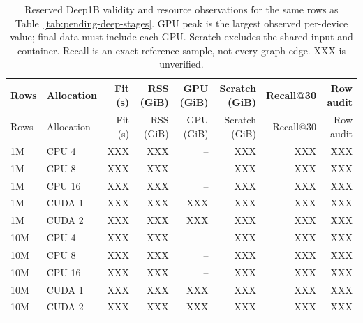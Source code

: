 \documentclass[article]{jss}
\begin{document}
{\scriptsize
\setlength{\tabcolsep}{2.5pt}
\begin{longtable}{llrrrrrr}
\caption{Reserved Deep1B validity and resource observations for the
  same rows as Table~\ref{tab:pending-deep-stages}. GPU peak is the
  largest observed per-device value; final data must include each GPU.
  Scratch excludes the shared input and container. Recall is an
  exact-reference sample, not every graph edge. XXX is unverified.}
\label{tab:pending-deep-validity}\\
\toprule
Rows & Allocation & Fit (s) & RSS (GiB) & GPU (GiB) &
  Scratch (GiB) & Recall@30 & Row audit \\
\midrule
\endfirsthead
\toprule
Rows & Allocation & Fit (s) & RSS (GiB) & GPU (GiB) &
  Scratch (GiB) & Recall@30 & Row audit \\
\midrule
\endhead
1M & CPU 4 & XXX & XXX & -- & XXX & XXX & XXX \\
1M & CPU 8 & XXX & XXX & -- & XXX & XXX & XXX \\
1M & CPU 16 & XXX & XXX & -- & XXX & XXX & XXX \\
1M & CUDA 1 & XXX & XXX & XXX & XXX & XXX & XXX \\
1M & CUDA 2 & XXX & XXX & XXX & XXX & XXX & XXX \\
10M & CPU 4 & XXX & XXX & -- & XXX & XXX & XXX \\
10M & CPU 8 & XXX & XXX & -- & XXX & XXX & XXX \\
10M & CPU 16 & XXX & XXX & -- & XXX & XXX & XXX \\
10M & CUDA 1 & XXX & XXX & XXX & XXX & XXX & XXX \\
10M & CUDA 2 & XXX & XXX & XXX & XXX & XXX & XXX \\
\bottomrule
\end{longtable}
}
\end{document}
